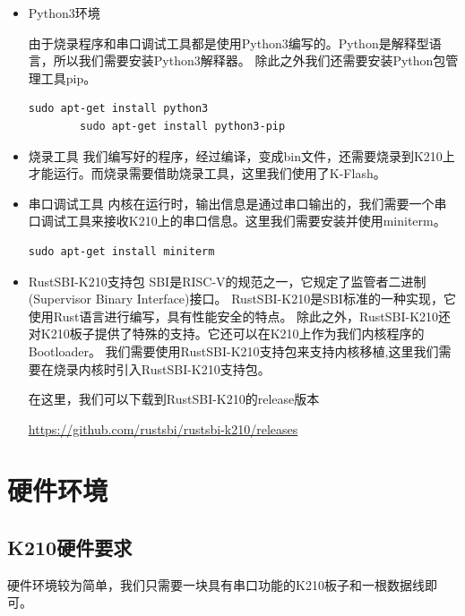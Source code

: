 \begin{itemize}
    \item Python3环境
    
    由于烧录程序和串口调试工具都是使用Python3编写的。Python是解释型语言，所以我们需要安装Python3解释器。\cite{2009Python}
    除此之外我们还需要安装Python包管理工具pip。\cite{2013Installing}

    \begin{lstlisting}[caption={安装Python3环境}, label={lst:install_python3}]
        sudo apt-get install python3
        sudo apt-get install python3-pip
    \end{lstlisting}

    \item 烧录工具
    我们编写好的程序，经过编译，变成bin文件，还需要烧录到K210上才能运行。而烧录需要借助烧录工具，这里我们使用了K-Flash。
    \item 串口调试工具
    内核在运行时，输出信息是通过串口输出的，我们需要一个串口调试工具来接收K210上的串口信息。这里我们需要安装并使用miniterm。

    \begin{lstlisting}[caption={安装miniterm}, label={lst:install_miniterm}]
        sudo apt-get install miniterm
    \end{lstlisting}

    \item RustSBI-K210支持包
    SBI是RISC-V的规范之一，它规定了监管者二进制(Supervisor Binary Interface)接口。
    RustSBI-K210是SBI标准的一种实现，它使用Rust语言进行编写，具有性能安全的特点。
    除此之外，RustSBI-K210还对K210板子提供了特殊的支持。它还可以在K210上作为我们内核程序的Bootloader。\cite{马学文2005嵌入式系统中}
    我们需要使用RustSBI-K210支持包来支持内核移植,这里我们需要在烧录内核时引入RustSBI-K210支持包。

    在这里，我们可以下载到RustSBI-K210的release版本

    \href{https://github.com/rustsbi/rustsbi-k210/releases}{https://github.com/rustsbi/rustsbi-k210/releases}
    
\end{itemize}

\section{硬件环境}

\subsection{K210硬件要求}

硬件环境较为简单，我们只需要一块具有串口功能的K210板子和一根数据线即可。

